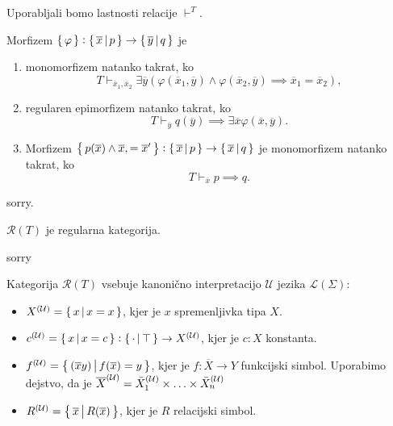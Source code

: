 \documentclass[../kategoricna_logika.tex]{subfiles}
\begin{document}
\begin{dokaz}
  Uporabljali bomo lastnosti relacije $\vdash^T$.
\end{dokaz}
\begin{lema}
  Morfizem $\set{\varphi} : \set{\overline{x}\,\middle|\, p} \to \set{\overline{y}\,\middle|\, q}$ je
  \begin{enumerate}[label=(\roman*)]
    \item monomorfizem natanko takrat, ko
      $$T \vdash_{\overline{x}_1,\overline{x}_2}  \exists \overline{y} \left( \varphi(\overline{x}_1,\overline{y}) \wedge \varphi(\overline{x}_2,\overline{y}) \implies \overline{x}_1 = \overline{x}_2 \right),$$
    \item regularen epimorfizem natanko takrat, ko
      $$T \vdash_{\overline{y}} q(\overline{y}) \implies \exists \overline{x} \varphi(\overline{x},\overline{y}).$$
    \item Morfizem $\set{p(\overline{x}) \wedge \overline{x}, = \overline{x}'} : \set{\overline{x}\,\middle|\, p } \to \set{\overline{x}\,\middle|\, q}$ je monomorfizem natanko takrat, ko
      $$T \vdash_{\overline{x}} p \implies q.$$
  \end{enumerate}
\end{lema}
\begin{dokaz}
  sorry.
\end{dokaz}
\begin{trditev}
  $\mathcal{R}(T)$ je regularna kategorija.
\end{trditev}
\begin{dokaz}
  sorry
\end{dokaz}
\begin{definicija}
  Kategorija $\mathcal{R}(T)$ vsebuje kanonično interpretacijo $\mathcal{U}$ jezika $\mathcal{L}(\Sigma)$:
  \begin{itemize}
    \item $\interp[\mathcal{U}]{X} = \set{x\,\middle|\, x = x}$, kjer je $x$ spremenljivka tipa $X$.
    \item $\interp[\mathcal{U}]{c} = \set{x\,\middle|\, x = c} : \set{\cdot\,\middle|\, \top} \to \interp[\mathcal{U}]{X}$, kjer je $c:X$ konstanta.
    \item $\interp[\mathcal{U}]{f} = \set{(\overline{x}y)\,\middle|\, f(\overline{x}) = y}$,
      kjer je $f : \overline{X}\to Y$ funkcijski simbol. Uporabimo dejstvo, da je $\overline{X}^{(\mathcal{U})} = \interp[\mathcal{U}]{\bar{X}_1} \times \ldots \times \interp[\mathcal{U}]{\bar{X}_n}$
    \item $\interp[\mathcal{U}]{R} = \set{\overline{x}\,\middle|\, R(\overline{x})}$, kjer je $R$ relacijski simbol.
  \end{itemize}
\end{definicija}
\end{document}
